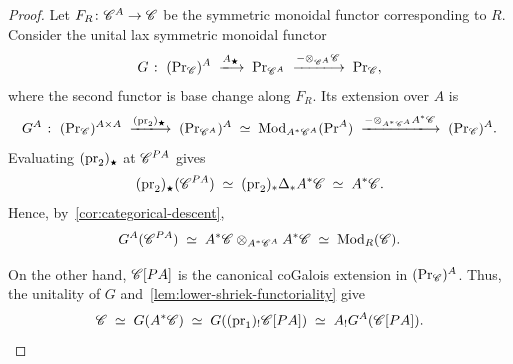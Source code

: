 \documentclass[english,svgnames,table]{article}
\begin{document}
    \begin{proof}
        Let $F_R \colon \mathscr{C}^A \to \mathscr{C}$ be the symmetric monoidal functor corresponding to $R$. Consider the unital lax symmetric monoidal functor
        \begin{equation*}
            G \;\colon\; (\ModC)^A \;\xtoo{A_{\scriptscriptstyle\bigstar}}\; \ModC[\cC^A] \;\xtoo{-\otimes_{\cC^A}\cC}\; \ModC,
        \end{equation*}
        where the second functor is base change along $F_R$.
        Its extension over $A$ is
        \begin{equation*}
            G^A \;\colon\; (\ModC)^{A\times A} 
            \;\xtoo{(\pr_2)_{\scriptscriptstyle\bigstar}}\; (\ModC[\cC^A])^A
            \;\simeq\; \Mod_{A^*\cC^A}(\Pr^A)
            \;\xtoo{-\otimes_{A^*\cC^A}A^*\cC}\; (\ModC)^A.
        \end{equation*}
        Evaluating $(\mathrm{pr}_2)_{\scriptscriptstyle\bigstar}$ at $\mathscr{C}^{P A}$ gives
        \begin{equation*}
            (\mathrm{pr}_2)_{\scriptscriptstyle\bigstar}(\mathscr{C}^{P A}) \;\simeq\; (\mathrm{pr}_2)_*\Delta_*A^*\mathscr{C} \;\simeq\; A^*\mathscr{C}.
        \end{equation*}
        Hence, by~\cref{cor:categorical-descent},
        \begin{equation*}
            G^A(\mathscr{C}^{P A}) \;\simeq\; A^*\mathscr{C}\otimes_{A^*\mathscr{C}^A}A^*\mathscr{C} \;\simeq\; \operatorname{Mod}_R(\mathscr{C}).
        \end{equation*}

        On the other hand, $\mathscr{C}[P A]$ is the canonical coGalois extension in $(\operatorname{Pr}_{\mathscr{C}})^A$. Thus, the unitality of $G$ and~\cref{lem:lower-shriek-functoriality} give
        \begin{equation*}
            \mathscr{C} \;\simeq\; G(A^*\mathscr{C}) \;\simeq\; G((\mathrm{pr}_1)_!\mathscr{C}[P A]) \;\simeq\; A_!G^A(\mathscr{C}[P A]).
        \end{equation*}
        

\end{proof}
\end{document}
